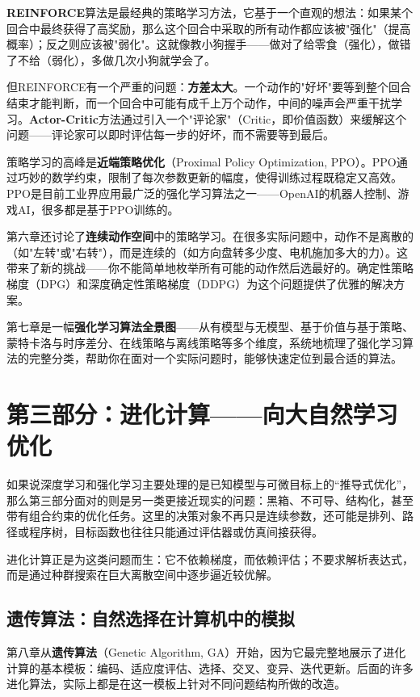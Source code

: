 \documentclass[lang=cn,zihao=-4,a4paper,fontset=windows]{beautybook}
\begin{document}
{\textbf{REINFORCE}算法是最经典的策略学习方法，它基于一个直观的想法：如果某个回合中最终获得了高奖励，那么这个回合中采取的所有动作都应该被"强化"（提高概率）；反之则应该被"弱化"。这就像教小狗握手——做对了给零食（强化），做错了不给（弱化），多做几次小狗就学会了。

但REINFORCE有一个严重的问题：\textbf{方差太大}。一个动作的"好坏"要等到整个回合结束才能判断，而一个回合中可能有成千上万个动作，中间的噪声会严重干扰学习。\textbf{Actor-Critic}方法通过引入一个"评论家"（Critic，即价值函数）来缓解这个问题——评论家可以即时评估每一步的好坏，而不需要等到最后。

策略学习的高峰是\textbf{近端策略优化}（Proximal Policy Optimization, PPO）。PPO通过巧妙的数学约束，限制了每次参数更新的幅度，使得训练过程既稳定又高效。PPO是目前工业界应用最广泛的强化学习算法之一——OpenAI的机器人控制、游戏AI，很多都是基于PPO训练的。

第六章还讨论了\textbf{连续动作空间}中的策略学习。在很多实际问题中，动作不是离散的（如"左转"或"右转"），而是连续的（如方向盘转多少度、电机施加多大的力）。这带来了新的挑战——你不能简单地枚举所有可能的动作然后选最好的。确定性策略梯度（DPG）和深度确定性策略梯度（DDPG）为这个问题提供了优雅的解决方案。

第七章是一幅\textbf{强化学习算法全景图}——从有模型与无模型、基于价值与基于策略、蒙特卡洛与时序差分、在线策略与离线策略等多个维度，系统地梳理了强化学习算法的完整分类，帮助你在面对一个实际问题时，能够快速定位到最合适的算法。

\section*{第三部分：进化计算——向大自然学习优化}

如果说深度学习和强化学习主要处理的是已知模型与可微目标上的“推导式优化”，那么第三部分面对的则是另一类更接近现实的问题：黑箱、不可导、结构化，甚至带有组合约束的优化任务。这里的决策对象不再只是连续参数，还可能是排列、路径或程序树，目标函数也往往只能通过评估器或仿真间接获得。

进化计算正是为这类问题而生：它不依赖梯度，而依赖评估；不要求解析表达式，而是通过种群搜索在巨大离散空间中逐步逼近较优解。

\subsection*{遗传算法：自然选择在计算机中的模拟}

第八章从\textbf{遗传算法}（Genetic Algorithm, GA）开始，因为它最完整地展示了进化计算的基本模板：编码、适应度评估、选择、交叉、变异、迭代更新。后面的许多进化算法，实际上都是在这一模板上针对不同问题结构所做的改造。

}
\end{document}
